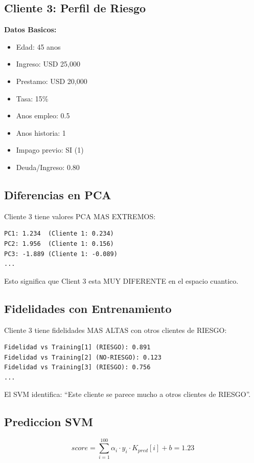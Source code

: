 \documentclass[11pt]{article}
\begin{document}
\subsection*{Cliente 3: Perfil de Riesgo}

\textbf{Datos Basicos:}
\begin{itemize}
\item Edad: 45 anos
\item Ingreso: USD 25,000
\item Prestamo: USD 20,000
\item Tasa: 15\%
\item Anos empleo: 0.5
\item Anos historia: 1
\item Impago previo: SI (1)
\item Deuda/Ingreso: 0.80
\end{itemize}

\subsection*{Diferencias en PCA}

Cliente 3 tiene valores PCA MAS EXTREMOS:

\begin{verbatim}
PC1: 1.234  (Cliente 1: 0.234)
PC2: 1.956  (Cliente 1: 0.156)
PC3: -1.889 (Cliente 1: -0.089)
...
\end{verbatim}

Esto significa que Client 3 esta MUY DIFERENTE en el espacio cuantico.

\subsection*{Fidelidades con Entrenamiento}

Cliente 3 tiene fidelidades MAS ALTAS con otros clientes de RIESGO:

\begin{verbatim}
Fidelidad vs Training[1] (RIESGO): 0.891
Fidelidad vs Training[2] (NO-RIESGO): 0.123
Fidelidad vs Training[3] (RIESGO): 0.756
...
\end{verbatim}

El SVM identifica: ``Este cliente se parece mucho a otros clientes de RIESGO''.

\subsection*{Prediccion SVM}

$$score = \sum_{i=1}^{100} \alpha_i \cdot y_i \cdot K_{pred}[i] + b = 1.23$$
\end{document}
